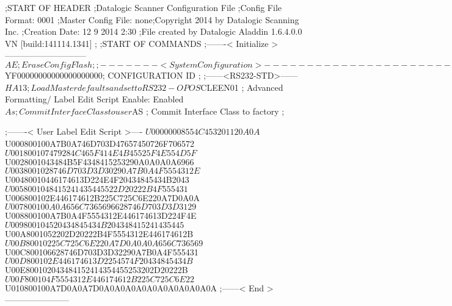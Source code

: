 ;START OF HEADER
;Datalogic Scanner Configuration File
;Config File Format: 0001
;Master Config File: none;Copyright 2014 by Datalogic Scanning Inc.
;Creation Date: 12 9 2014 2:30
;File created by Datalogic Aladdin 1.6.4.0.0 VN [build:141114.1341]
;
;START OF COMMANDS
;-------< Initialize >-----------------------------
$AE                 ; Erase Config Flash
;
;-------< System Configuration >-------------------------------
$YF00000000000000000000; CONFIGURATION ID
;
;------<RS232-STD>------
$HA13               ; Load Master defaults and set to RS232-OPOS
$CLEEN01            ; Advanced Formatting/ Label Edit Script Enable: Enabled
$As                 ; Commit Interface Class to user
$AS                 ; Commit Interface Class to factory
;

;-------< User Label Edit Script >----
$U00000008554C453201120A0A
$U000800100A7B0A746D703D47657450726F706572
$U001800107479284C465F414E4B45525F4E554D5F
$U0028001043484B5F4348415253290A0A0A0A6966
$U0038001028746D703D3D30290A7B0A4F5554312E
$U00480010446174613D224E4F20434845434B2043
$U0058001048415241435445522D20222B4F555431
$U006800102E446174612B225C725C6E220A7D0A0A
$U007800100A0A656C7365696628746D703D3D3129
$U008800100A7B0A4F5554312E446174613D224F4E
$U009800104520434845434B204348415241435445
$U00A8001052202D20222B4F5554312E446174612B
$U00B80010225C725C6E220A7D0A0A0A656C736569
$U00C800106628746D703D3D32290A7B0A4F555431
$U00D800102E446174613D2254574F20434845434B
$U00E800102043484152414354455253202D20222B
$U00F800104F5554312E446174612B225C725C6E22
$U010800100A7D0A0A7D0A0A0A0A0A0A0A0A0A0A0A
;------< End >-----------------------
